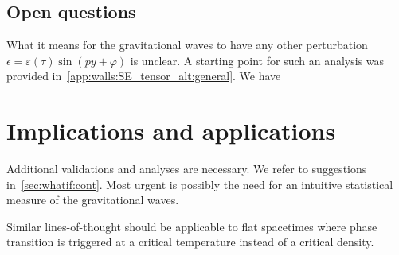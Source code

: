 
    \subsection{Open questions}
    What it means for the gravitational waves to have any other perturbation $\epsilon= \varepsilon(\tau) \sin{(py + \varphi)}$ is unclear. A starting point for such an analysis was provided in~\cref{app:walls:SE_tensor_alt:general}. 
    We have \blahblah


    




\section{Implications and applications}
    Additional validations and analyses are necessary. We refer to suggestions in~\cref{sec:whatif:cont}. 
    Most urgent is possibly the need for an intuitive statistical measure of the gravitational waves. 



    Similar lines-of-thought should be applicable to flat spacetimes where phase transition is triggered at a critical temperature instead of a critical density. 
    
    





